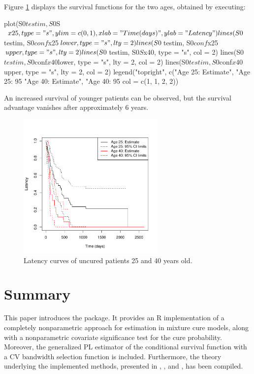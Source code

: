 Figure \ref{fig:latencycond} displays the survival functions for the two ages, obtained by executing: 
\begin{example}
plot(S0$testim, S0$S$x25, type = "s", ylim = c(0, 1),
   xlab = "Time (days)", ylab = "Latency")
lines(S0$testim, S0$conf$x25$lower, type = "s", lty = 2)
lines(S0$testim, S0$conf$x25$upper, type = "s", lty = 2)
lines(S0$testim, S0$S$x40, type = "s", col = 2)
lines(S0$testim, S0$conf$x40$lower, type = "s", lty = 2, col = 2)
lines(S0$testim, S0$conf$x40$upper, type = "s", lty = 2, col = 2)
legend("topright", c("Age 25: Estimate", "Age 25: 95%
   "Age 40: Estimate", "Age 40: 95%
   col = c(1, 1, 2, 2))
\end{example}

An increased survival of younger patients can be observed, but the survival advantage vanishes after approximately 6 years.


\begin{figure}[htbp]
  \centering
  \includegraphics[width=7.2cm, height=7.2cm]{Figure-057}
  \caption{Latency curves of uncured patients 25 and 40 years old.}
  \label{fig:latencycond} 
\end{figure}





\section{Summary}

This paper introduces the  package. It provides an R implementation of a completely nonparametric approach for estimation in mixture cure models, along with a nonparametric covariate significance test for the cure probability. Moreover, the generalized PL estimator of the conditional survival function with a CV bandwidth selection function is included. Furthermore, the theory underlying the implemented me\-thods, presented in \cite{Xu}, \cite{Lopez1}, and \cite{Lopez2}, has been compiled. 

